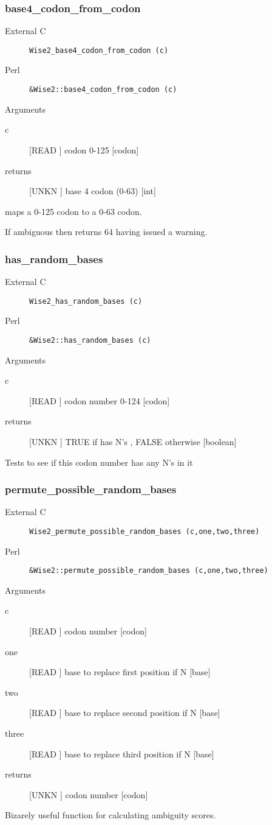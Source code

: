 \subsubsection{base4_codon_from_codon}
\begin{description}
\item[External C] {\tt Wise2_base4_codon_from_codon (c)}
\item[Perl] {\tt &Wise2::base4_codon_from_codon (c)}

\end{description}
Arguments
\begin{description}
\item[c] [READ ] codon 0-125 [codon]
\item[returns] [UNKN ] base 4 codon (0-63) [int]
\end{description}
maps a 0-125 codon to a 0-63 codon.


If ambiguous then returns 64 having issued a warning.


\subsubsection{has_random_bases}
\begin{description}
\item[External C] {\tt Wise2_has_random_bases (c)}
\item[Perl] {\tt &Wise2::has_random_bases (c)}

\end{description}
Arguments
\begin{description}
\item[c] [READ ] codon number 0-124 [codon]
\item[returns] [UNKN ] TRUE if has N's , FALSE otherwise [boolean]
\end{description}
Tests to see if this codon number has any N's in it


\subsubsection{permute_possible_random_bases}
\begin{description}
\item[External C] {\tt Wise2_permute_possible_random_bases (c,one,two,three)}
\item[Perl] {\tt &Wise2::permute_possible_random_bases (c,one,two,three)}

\end{description}
Arguments
\begin{description}
\item[c] [READ ] codon number [codon]
\item[one] [READ ] base to replace first position if N [base]
\item[two] [READ ] base to replace second position if N [base]
\item[three] [READ ] base to replace third position if N [base]
\item[returns] [UNKN ] codon number  [codon]
\end{description}
Bizarely useful function for calculating ambiguity scores.


